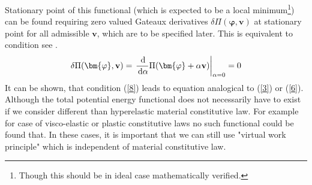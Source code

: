 \documentclass{article}
\newcommand{\beq}{\begin{equation}}
\newcommand{\eeq}{\end{equation}}
\newcommand{\dd}{\,{\rm d}}
\begin{document}
Stationary point of this functional (which is expected to be a local minimum\footnote{Though this should be in ideal case mathematically verified.}) can be found requiring zero valued Gateaux derivatives $ \delta \Pi(\bm{\varphi},\mathbf{v}) $ at stationary point for all admissible $ \mathbf{v} $, which are to be specified later. This is equivalent to condition see \cite[Chapter 2, p.31]{Wriggers}.
\beq\label{8}
\delta \Pi(\bm{\varphi},\mathbf{v})=\left.\frac{\dd}{\dd \alpha} \Pi(\bm{\varphi}+\alpha \mathbf{v})\right|_{\alpha=0} = 0
\eeq
It can be shown, that condition (\ref{8}) leads to equation analogical to (\ref{3}) or (\ref{6}). Although the total potential energy functional does not necessarily have to exist if we consider different than hyperelastic material constitutive law. For example for case of visco-elastic or plastic constitutive laws no such functional could be found that. In these cases, it is important that we can still use "virtual work principle" which is independent of material constitutive law.
\end{document}
